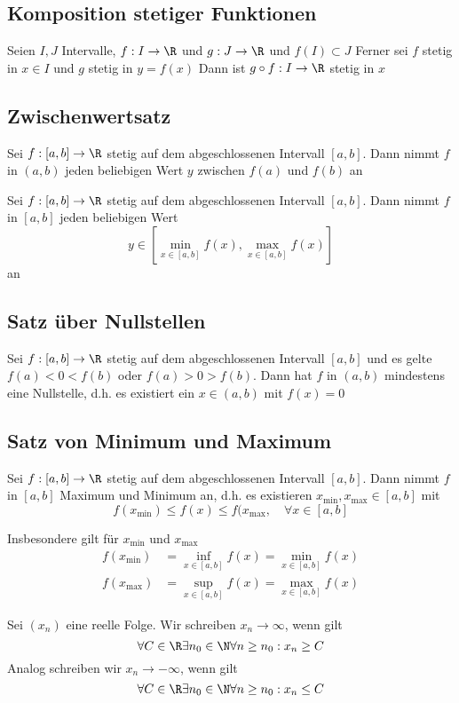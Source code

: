 	\subsection{Komposition stetiger Funktionen}
		\begin{Satz} [ ]
			Seien $I, J$ Intervalle, $f: I\to\R$ und $g: J\to \R$ und $f(I)\subset J$ \newline 
			Ferner sei $f$ stetig in $x\in I$ und $g$ stetig in $y=f(x)$ \newline
			Dann ist $g\circ f: I\to \R$ stetig in $x$
		\end{Satz}
	\subsection{Zwischenwertsatz}
		\begin{Satz} [ Zwischenwertsatz]
			Sei $f:[a, b]\to\R$ stetig auf dem abgeschlossenen Intervall $[a, b]$. Dann nimmt $f$ in $(a, b)$ jeden beliebigen Wert $y$ zwischen $f(a)$ und $f(b)$ an
		\end{Satz}
		\begin{Satz} 
			Sei $f:[a, b]\to \R$ stetig auf dem abgeschlossenen Intervall $[a, b]$. Dann nimmt $f$ in $[a, b]$ jeden beliebigen Wert
			$$
				y\in [\min_{x\in[a, b]}f(x), \max_{x\in[a, b]}f(x)]
			$$
			an
		\end{Satz}
	\subsection{Satz über Nullstellen}
		\begin{Satz} [ Nullstellen]
			Sei $f:[a, b]\to \R$ stetig auf dem abgeschlossenen Intervall $[a, b]$ und es gelte $f(a)<0<f(b)$ oder $f(a) > 0 > f(b)$. Dann hat $f$ in $(a, b)$ mindestens eine Nullstelle, d.h. es existiert ein $x\in(a, b)$ mit $f(x)=0$
		\end{Satz}
	\subsection{Satz von Minimum und Maximum}
		\begin{Satz} 
			Sei $f:[a, b]\to \R$ stetig auf dem abgeschlossenen Intervall $[a, b]$. Dann nimmt $f$ in $[a, b]$ Maximum und Minimum an, d.h. es existieren $x_{\min}
			, x_{\max} \in [a, b]$ mit 
			$$
				f(x_{\min})\leq f(x) \leq f(x_{\max}, \quad \forall x\in [a, b]
			$$
		\end{Satz}
		Insbesondere gilt für $x_{\min}$ und $x_{\max}$
		\begin{align*}
			f(x_{\min}) &= \inf_{x\in[a, b]} f(x) = \min_{x\in [a, b]} f(x) \\
			f(x_{\max}) & = \sup_{x\in [a, b]} f(x) = \max_{x \in [a, b]} f(x)
		\end{align*}
		\begin{Definition} [ Schreibweisen]
			Sei $(x_n)$ eine reelle Folge. Wir schreiben $x_n\to\infty$, wenn gilt
			$$
				\forall C \in \R\exists n_0\in\N\forall n\geq n_0: x_n\geq C
			$$
			Analog schreiben wir $x_n\to -\infty$, wenn gilt
			$$
				\forall C \in\R\exists n_0\in\N\forall n\geq n_0:x_n\leq C
			$$
		\end{Definition}
